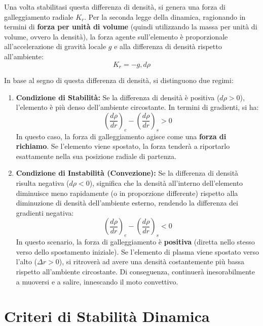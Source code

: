 Una volta stabilitasi questa differenza di densità, si genera una forza di galleggiamento radiale $K_r$. Per la seconda legge della dinamica, ragionando in termini di \textbf{forza per unità di volume} (quindi utilizzando la massa per unità di volume, ovvero la densità), la forza agente sull'elemento è proporzionale all'accelerazione di gravità locale $g$ e alla differenza di densità rispetto all'ambiente:
\begin{equation}
K_r = - g , d\rho
\end{equation}

In base al segno di questa differenza di densità, si distinguono due regimi:

\begin{enumerate}
\item \textbf{Condizione di Stabilità:}
Se la differenza di densità è positiva ($d\rho > 0$), l'elemento è più denso dell'ambiente circostante. In termini di gradienti, si ha:
\begin{equation}
\left( \frac{d\rho}{dr} \right)_e - \left( \frac{d\rho}{dr} \right)_s > 0
\end{equation}
In questo caso, la forza di galleggiamento agisce come una \textbf{forza di richiamo}. Se l'elemento viene spostato, la forza tenderà a riportarlo esattamente nella sua posizione radiale di partenza.

\item \textbf{Condizione di Instabilità (Convezione):} 
Se la differenza di densità risulta negativa ($d\rho < 0$), significa che la densità all'interno dell'elemento diminuisce meno rapidamente (o in proporzione differente) rispetto alla diminuzione di densità dell'ambiente esterno, rendendo la differenza dei gradienti negativa:
\begin{equation}
    \left( \frac{d\rho}{dr} \right)_e - \left( \frac{d\rho}{dr} \right)_s < 0
\end{equation}
In questo scenario, la forza di galleggiamento è \textbf{positiva} (diretta nello stesso verso dello spostamento iniziale). Se l'elemento di plasma viene spostato verso l'alto ($\Delta r > 0$), si ritroverà ad avere una densità costantemente più bassa rispetto all'ambiente circostante. Di conseguenza, continuerà inesorabilmente a muoversi e a salire, innescando il moto convettivo.

\end{enumerate}

\section{Criteri di Stabilità Dinamica}

